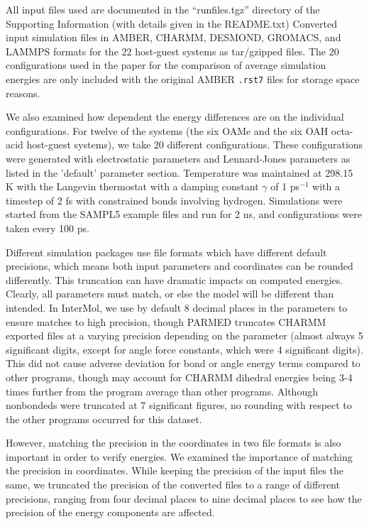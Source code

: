 All input files used are documented in the ``runfiles.tgz'' directory
of the Supporting Information (with details given in the README.txt)
Converted input simulation files in AMBER, CHARMM, DESMOND, GROMACS,
and LAMMPS formats for the 22 host-guest systems as tar/gzipped files.
The 20 configurations used in the paper for the comparison of average
simulation energies are only included with the original AMBER
{\tt .rst7} files for storage space reasons.

We also examined how dependent the energy differences are on the
individual configurations. For twelve of the systems (the six OAMe and
the six OAH octa-acid host-guest systems), we take 20 different
configurations. These configurations were generated with electrostatic
parameters and Lennard-Jones parameters as listed in the 'default'
parameter section. Temperature was maintained at 298.15 K with the
Langevin thermostat with a damping constant $\gamma$ of 1 ps$^{-1}$
with a timestep of 2 fs with constrained bonds involving
hydrogen. Simulations were started from the SAMPL5 example files and
run for 2 ns, and configurations were taken every 100 ps.

Different simulation packages use file formats which have different
default precisions, which means both input parameters and coordinates
can be rounded differently. This truncation can have dramatic impacts
on computed energies. Clearly, all parameters must match, or else the
model will be different than intended. In InterMol, we use by default
8 decimal places in the parameters to ensure matches to high
precision, though PARMED truncates CHARMM exported files at a varying
precision depending on the parameter (almost always 5 significant
digits, except for angle force constants, which were 4 significant
digits). This did not cause adverse deviation for bond or angle energy
terms compared to other programs, though may account for CHARMM
dihedral energies being 3-4 times further from the program average
than other programs. Although nonbondeds were truncated at 7
significant figures, no rounding with respect to the other programs
occurred for this dataset.

However, matching the
precision in the coordinates in two file formats is also important in
order to verify energies. We examined the importance of matching the
precision in coordinates.  While keeping the precision of the input
files the same, we truncated the precision of the converted files to a
range of different precisions, ranging from four decimal places to
nine decimal places to see how the precision of the energy components
are affected.
 
